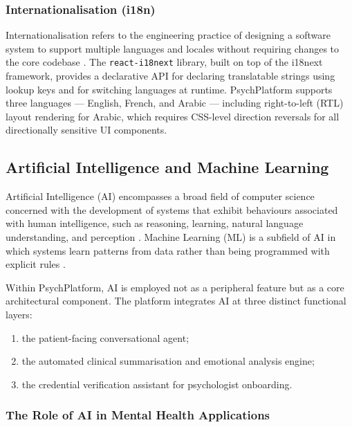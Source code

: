\subsubsection{Internationalisation (i18n)}

Internationalisation refers to the engineering practice of designing a software
system to support multiple languages and locales without requiring changes to the
core codebase \cite{W3C2005}. The \texttt{react-i18next} library, built on top
of the i18next framework, provides a declarative API for declaring translatable
strings using lookup keys and for switching languages at runtime. PsychPlatform
supports three languages — English, French, and Arabic — including right-to-left
(RTL) layout rendering for Arabic, which requires CSS-level direction reversals
for all directionally sensitive UI components.

\subsection{Artificial Intelligence and Machine Learning}
\label{subsec:ai-ml}

Artificial Intelligence (AI) encompasses a broad field of computer science
concerned with the development of systems that exhibit behaviours associated with
human intelligence, such as reasoning, learning, natural language understanding,
and perception \cite{Russell2020}. Machine Learning (ML) is a subfield of AI in
which systems learn patterns from data rather than being programmed with explicit
rules \cite{Mitchell1997}.

Within PsychPlatform, AI is employed not as a peripheral feature but as a core
architectural component. The platform integrates AI at three distinct functional
layers:
\begin{enumerate}[label=(\arabic*), itemsep=2pt]
  \item the patient-facing conversational agent;
  \item the automated clinical summarisation and emotional analysis engine;
  \item the credential verification assistant for psychologist onboarding.
\end{enumerate}

\subsubsection{The Role of AI in Mental Health Applications}

